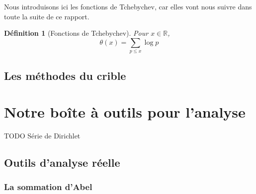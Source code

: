 \documentclass[french]{report}
\newtheorem{definition}[theorem]{Définition}
\begin{document}
Nous introduisons ici les fonctions de Tchebychev, car elles vont nous suivre dans toute la suite de ce rapport.

\begin{definition}[Fonctions de Tchebychev] Pour $x\in \mathbb{R}$,
  \[ \theta(x) = \sum_{p \le x}\log p \]
\end{definition}

\section{Les méthodes du crible}

\chapter{Notre boîte à outils pour l'analyse}

TODO Série de Dirichlet

\section{Outils d'analyse réelle}

\subsection{La sommation d'Abel}
\end{document}
